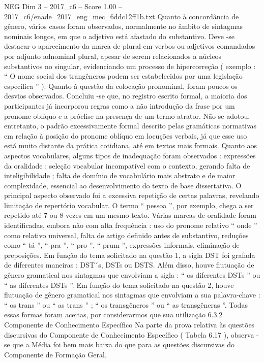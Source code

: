 \begin{textsample}{NEG Dim 3 – 2017\_c6 – Score 1.00 – 2017\_c6/enade\_2017\_eng\_mec\_6ddc12ff1b.txt}
Quanto à concordância de gênero, vários casos foram observados, normalmente no âmbito de sintagmas nominais longos, em que o adjetivo está afastado do substantivo.
Deve -se destacar o aparecimento da marca de plural em verbos ou adjetivos comandados por adjunto adnominal plural, apesar de serem relacionados a núcleos substantivos no singular, evidenciando um processo de hipercorreção ( exemplo : “ O nome social dos trangêneros podem ser estabelecidos por uma legislação específica ” ).
Quanto à questão da colocação pronominal, foram poucos os desvios observados.
Concluiu -se que, no registro escrito formal, a maioria dos participantes já incorporou regras como a não introdução da frase por um pronome oblíquo e a próclise na presença de um termo atrator.
Não se adotou, entretanto, o padrão excessivamente formal descrito pelas gramáticas normativas em relação à posição do pronome oblíquo em locuções verbais, já que esse uso está muito distante da prática cotidiana, até em textos mais formais.
Quanto aos aspectos vocabulares, alguns tipos de inadequação foram observados : expressões da oralidade ; seleção vocabular incompatível com o contexto, gerando falta de inteligibilidade ; falta de domínio de vocabulário mais abstrato e de maior complexidade, essencial ao desenvolvimento do texto de base dissertativa.
O principal aspecto observado foi a excessiva repetição de certas palavras, revelando limitação de repertório vocabular.
O termo “ pessoa ”, por exemplo, chega a ser repetido até 7 ou 8 vezes em um mesmo texto.
Várias marcas de oralidade foram identificadas, embora não com alta frequência : uso do pronome relativo “ onde ” como relativo universal, falta de artigo definido antes de substantivo, reduções como “ tá ”, “ pra ”, “ pro ”, “ prum ”, expressões informais, eliminação de preposições.
Em função do tema solicitado na questão 1, a sigla DST foi grafada de diferentes maneiras : DST´s, DSTs ou DSTS.
Além disso, houve flutuação de gênero gramatical nos sintagmas que envolviam a sigla : “ os diferentes DSTs ” ou “ as diferentes DSTs ”.
Em função do tema solicitado na questão 2, houve flutuação de gênero gramatical nos sintagmas que envolviam a sua palavra-chave : “ os trans ” ou “ as trans ” ; “ os transgêneros ” ou “ as transgêneras ”.
Todas essas formas foram aceitas, por considerarmos que sua utilização 6.3.2 Componente de Conhecimento Específico Na parte da prova relativa às questões discursivas do Componente de Conhecimento Específico ( Tabela 6.17 ), observa -se que a Média foi bem mais baixa do que para as questões discursivas do Componente de Formação Geral.

\end{textsample}
